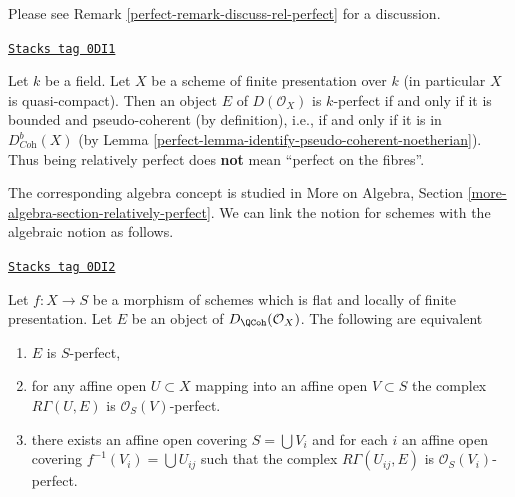 Please see Remark \ref{perfect-remark-discuss-rel-perfect} for a discussion.

\begin{example}
\label{perfect-example-relatively-perfect-field}
\href{https://stacks.math.columbia.edu/tag/0DI1}{\texttt{Stacks tag 0DI1}}

Let $k$ be a field. Let $X$ be a scheme of finite presentation over $k$
(in particular $X$ is quasi-compact). Then an object $E$ of $D(\mathcal{O}_X)$
is $k$-perfect if and only if it is bounded and pseudo-coherent
(by definition), i.e., if and only if it is in $D^b_{\textit{Coh}}(X)$
(by Lemma \ref{perfect-lemma-identify-pseudo-coherent-noetherian}).
Thus being relatively perfect does {\bf not} mean ``perfect on the fibres''.
\end{example}

The corresponding algebra concept is studied in
More on Algebra, Section \ref{more-algebra-section-relatively-perfect}.
We can link the notion for schemes with the algebraic notion
as follows.

\begin{lemma}
\label{perfect-lemma-affine-locally-rel-perfect}
\href{https://stacks.math.columbia.edu/tag/0DI2}{\texttt{Stacks tag 0DI2}}

Let $f : X \to S$ be a morphism of schemes which is flat and
locally of finite presentation. Let $E$ be an object of
$D_\QCoh(\mathcal{O}_X)$. The following are equivalent
\begin{enumerate}
\item $E$ is $S$-perfect,
\item for any affine open $U \subset X$ mapping into an affine open
$V \subset S$ the complex $R\Gamma(U, E)$ is $\mathcal{O}_S(V)$-perfect.
\item there exists an affine open covering $S = \bigcup V_i$
and for each $i$ an affine open covering $f^{-1}(V_i) = \bigcup U_{ij}$
such that the complex $R\Gamma(U_{ij}, E)$ is $\mathcal{O}_S(V_i)$-perfect.
\end{enumerate}
\end{lemma}

